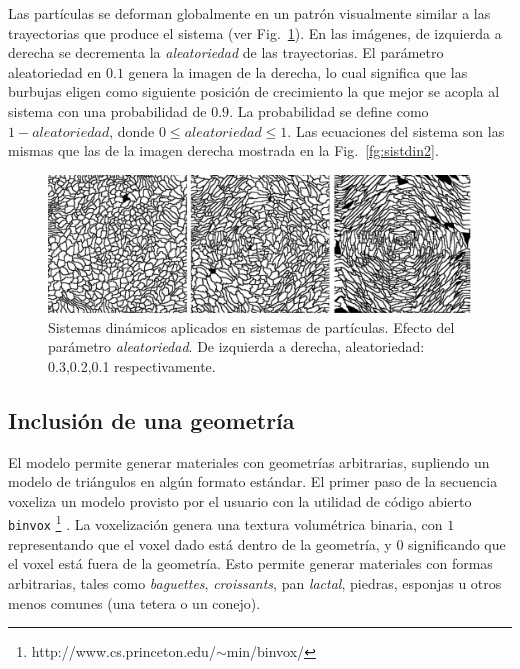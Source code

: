 Las part\'iculas se deforman globalmente en un patr\'on visualmente similar a las trayectorias que produce el sistema (ver Fig.~\ref{fg:sistdin3}).
En las im\'agenes, de izquierda a derecha se decrementa la {\em aleatoriedad} de las trayectorias.
El par\'ametro aleatoriedad en $0.1$ genera la imagen de la derecha, lo cual significa que las burbujas eligen como siguiente posición de crecimiento la que mejor se acopla al sistema con una probabilidad de $0.9$.
La probabilidad se define como $1-aleatoriedad$, donde $0 \leq aleatoriedad \leq 1$.
Las ecuaciones del sistema son las mismas que las de la imagen derecha mostrada en la Fig.~\ref{fg:sistdin2}.

\begin{figure}[htb!]
  \centerline{\includegraphics[width=12cm]{figures/Fig3}}
  \caption[Sistemas din\'amicos aplicados en sistemas de part\'iculas]{Sistemas din\'amicos aplicados en sistemas de part\'iculas. Efecto del parámetro {\em aleatoriedad}. De izquierda a derecha, aleatoriedad: 0.3,0.2,0.1 respectivamente. }
  \label{fg:sistdin3}
\end{figure}



\subsection{Inclusión de una geometría}

El modelo permite generar materiales con geometrías arbitrarias, supliendo un modelo de triángulos en algún formato estándar.
El primer paso de la secuencia voxeliza un modelo provisto por el usuario con la utilidad de código abierto {\tt binvox} \footnote{http://www.cs.princeton.edu/$\sim$min/binvox/} \cite{Nooruddin2003}.
La voxelización genera una textura volumétrica binaria, con $1$ representando que el voxel dado está dentro de la geometría, y $0$ significando que el voxel está fuera de la geometría.
Esto permite generar materiales con formas arbitrarias, tales como {\em baguettes}, {\em croissants}, pan {\em lactal}, piedras, esponjas u otros menos comunes (una tetera o un conejo).

